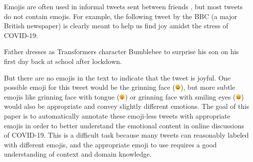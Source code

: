 \documentclass[11pt]{article}
\newcommand{\XXX}{{\textbf{XXX}}~}
\DeclareMathOperator{\corona}{\texttt{TwitterCorona}}
\begin{document}
Emojis are often used in informal tweets sent between friends \citep{marcel2016emoji},
but most tweets do not contain emojis.
For example, the following tweet by the BBC (a major British newspaper) is clearly meant to help us find joy amidst the stress of COVID-19:
\begin{displayquote}
    Father dresses as Transformers character Bumblebee to surprise his son on his first day back at school after lockdown.
\end{displayquote}
But there are no emojis in the text to indicate that the tweet is joyful.
One possible emoji for this tweet would be the grinning face (\includegraphics[height=0.8em]{images/grinning-face_1f600}),
but more subtle emojis like grinning face with tongue (\includegraphics[height=0.8em]{images/face-with-tongue_1f61b}) or grinning face with smiling eyes (\includegraphics[height=0.8em]{images/grinning-face-with-smiling-eyes_1f604}) would also be appropriate and convey slightly different emotions.
The goal of this paper is to automatically annotate these emoji-less tweets with appropriate emojis in order to better understand the emotional content in online discussions of COVID-19.
This is a difficult task because many tweets can reasonably labeled with different emojis,
and the appropriate emoji to use requires a good understanding of context and domain knowledge.
\end{document}
